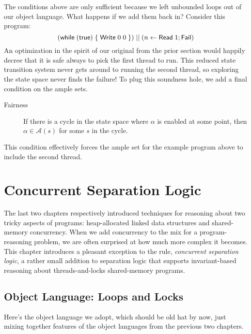 \documentclass{amsbook}
\theoremstyle{definition}
\theoremstyle{remark}
\numberwithin{section}{chapter}
\numberwithin{equation}{chapter}
\begin{document}
The conditions above are only sufficient because we left unbounded loops out of our object language.
What happens if we add them back in?
Consider this program:
$$(\mathsf{while} \; (\mathsf{true}) \; \{ \; \mathsf{Write} \; 0 \; 0 \; \}) \; || \; (n \leftarrow \mathsf{Read} \; 1; \mathsf{Fail})$$
An optimization in the spirit of our original from the prior section would happily decree that it is safe always to pick the first thread to run.
This reduced state transition system never gets around to running the second thread, so exploring the state space never finds the failure!
To plug this soundness hole, we add a final condition on the ample sets.

\begin{description}
  \item[Fairness] If there is a cycle in the state space where $\alpha$ is enabled at some point, then $\alpha \in \mathcal A(s)$ for some $s$ in the cycle.
\end{description}

This condition effectively forces the ample set for the example program above to include the second thread.



\chapter{Concurrent Separation Logic}

The last two chapters respectively introduced techniques for reasoning about two tricky aspects of programs: heap-allocated linked data structures and shared-memory concurrency.
When we add concurrency to the mix for a program-reasoning problem, we are often surprised at how much more complex it becomes.
This chapter introduces a pleasant exception to the rule, \emph{concurrent separation logic}, a rather small addition to separation logic that supports invariant-based reasoning about threads-and-locks shared-memory programs.

\section{Object Language: Loops and Locks}

Here's the object language we adopt, which should be old hat by now, just mixing together features of the object languages from the previous two chapters.
\end{document}
